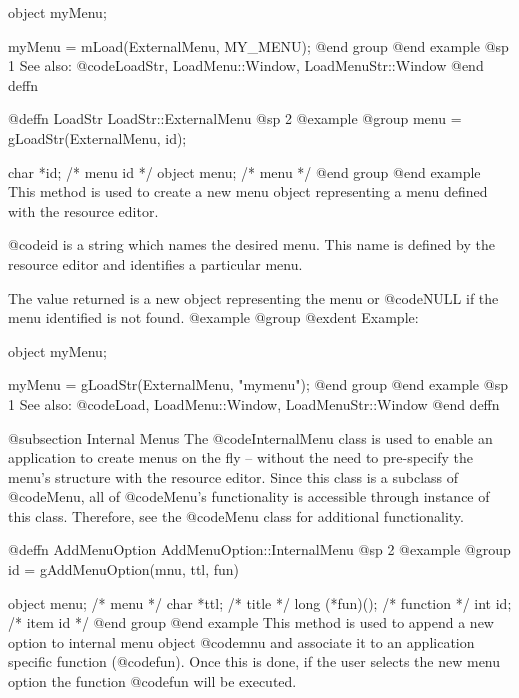 object  myMenu;

myMenu = mLoad(ExternalMenu, MY_MENU);
@end group
@end example
@sp 1
See also:  @code{LoadStr, LoadMenu::Window, LoadMenuStr::Window}
@end deffn







@deffn {LoadStr} LoadStr::ExternalMenu
@sp 2
@example
@group
menu = gLoadStr(ExternalMenu, id);

char    *id;    /*  menu id  */
object  menu;   /*  menu     */
@end group
@end example
This method is used to create a new menu object representing a menu defined
with the resource editor.

@code{id} is a string which names the desired menu.  This name is
defined by the resource editor and identifies a particular menu.

The value returned is a new object representing the menu or @code{NULL} if
the menu identified is not found.
@example
@group
@exdent Example:

object  myMenu;

myMenu = gLoadStr(ExternalMenu, "mymenu");
@end group
@end example
@sp 1
See also:  @code{Load, LoadMenu::Window, LoadMenuStr::Window}
@end deffn








@subsection Internal Menus
The @code{InternalMenu} class is used to enable an application to create
menus on the fly -- without the need to pre-specify the menu's structure
with the resource editor.  Since this class is a subclass of
@code{Menu}, all of @code{Menu}'s functionality is accessible through
instance of this class.  Therefore, see the @code{Menu} class for
additional functionality.








@deffn {AddMenuOption} AddMenuOption::InternalMenu
@sp 2
@example
@group
id = gAddMenuOption(mnu, ttl, fun)

object  menu;   /*  menu     */
char    *ttl;   /*  title    */
long    (*fun)(); /*  function  */
int     id;     /*  item id  */
@end group
@end example
This method is used to append a new option to internal menu object
@code{mnu} and associate it to an application specific function
(@code{fun}).  Once this is done, if the user selects the new menu
option the function @code{fun} will be executed.

